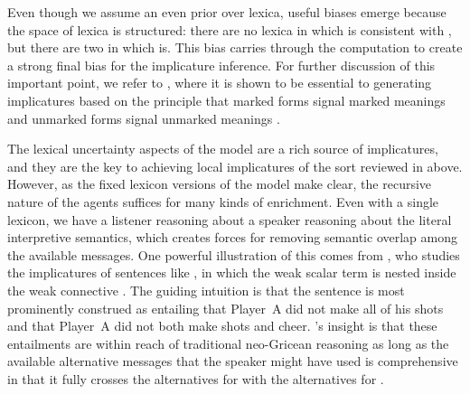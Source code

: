\documentclass[leqno,12pt]{article}
\begin{document}
Even though we assume an even prior over lexica, useful biases emerge
because the space of lexica is structured: there are no lexica in
which  is consistent with , but there are two in
which  is. This bias carries through the computation to
create a strong final bias for the implicature inference. For further
discussion of this important point, we refer to
\citealt{Bergen:Levy:Goodman:2014}, where it is shown to be essential to
generating implicatures based on the principle that marked forms
signal marked meanings and unmarked forms signal unmarked meanings
\citep{McCawley78,Horn84,Blutner98,Levinson00}.


The lexical uncertainty aspects of the model are a rich source of
implicatures, and they are the key to achieving local implicatures of
the sort reviewed in  above. However, as the
fixed lexicon versions of the model make clear, the recursive nature
of the agents suffices for many kinds of enrichment. Even with a
single lexicon, we have a listener reasoning about a speaker reasoning
about the literal interpretive semantics, which creates forces for
removing semantic overlap among the available messages. One powerful
illustration of this comes from \citet{Sauerland01,Sauerland04}, who
studies the implicatures of sentences like , in which the weak scalar term  is nested inside the weak connective . The
guiding intuition is that the sentence is most prominently construed
as entailing that Player~A did not make all of his shots and that
Player~A did not both make shots and cheer. \citeauthor{Sauerland01}'s
insight is that these entailments are within reach of traditional
neo-Gricean reasoning as long as the available alternative messages
that the speaker might have used is comprehensive in that it fully
crosses the alternatives for  with the alternatives for
.
\end{document}
